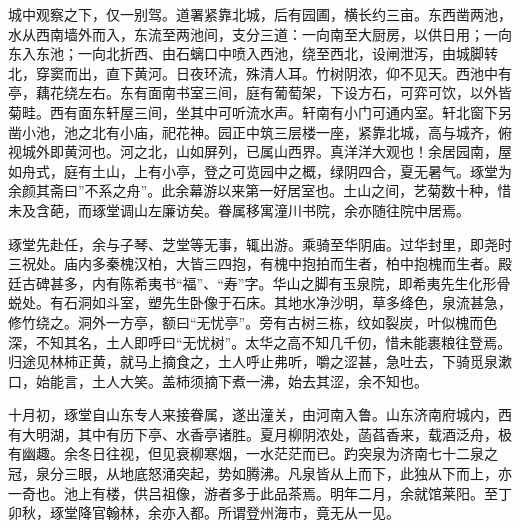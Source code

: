 \documentclass[]{article}
\begin{document}
城中观察之下，仅一别驾。道署紧靠北城，后有园圃，横长约三亩。东西凿两池，水从西南墙外而入，东流至两池间，支分三道：一向南至大厨房，以供日用；一向东入东池；一向北折西、由石螭口中喷入西池，绕至西北，设闸泄泻，由城脚转北，穿窦而出，直下黄河。日夜环流，殊清人耳。竹树阴浓，仰不见天。西池中有亭，藕花绕左右。东有面南书室三间，庭有葡萄架，下设方石，可弈可饮，以外皆菊畦。西有面东轩屋三间，坐其中可听流水声。轩南有小门可通内室。轩北窗下另凿小池，池之北有小庙，祀花神。园正中筑三层楼一座，紧靠北城，高与城齐，俯视城外即黄河也。河之北，山如屏列，已属山西界。真洋洋大观也！余居园南，屋如舟式，庭有土山，上有小亭，登之可览园中之概，绿阴四合，夏无暑气。琢堂为余颜其斋曰''不系之舟''。此余幕游以来第一好居室也。土山之间，艺菊数十种，惜未及含葩，而琢堂调山左廉访矣。眷属移寓潼川书院，余亦随往院中居焉。

琢堂先赴任，余与子琴、芝堂等无事，辄出游。乘骑至华阴庙。过华封里，即尧时三祝处。庙内多秦槐汉柏，大皆三四抱，有槐中抱拍而生者，柏中抱槐而生者。殿廷古碑甚多，内有陈希夷书``福''、``寿''字。华山之脚有玉泉院，即希夷先生化形骨蜕处。有石洞如斗室，塑先生卧像于石床。其地水净沙明，草多绛色，泉流甚急，修竹绕之。洞外一方亭，额曰``无忧亭''。旁有古树三栋，纹如裂炭，叶似槐而色深，不知其名，土人即呼曰``无忧树''。太华之高不知几千仞，惜未能裹粮往登焉。归途见林柿正黄，就马上摘食之，土人呼止弗听，嚼之涩甚，急吐去，下骑觅泉漱口，始能言，土人大笑。盖柿须摘下煮一沸，始去其涩，余不知也。

十月初，琢堂自山东专人来接眷属，遂出潼关，由河南入鲁。山东济南府城内，西有大明湖，其中有历下亭、水香亭诸胜。夏月柳阴浓处，菡萏香来，载酒泛舟，极有幽趣。余冬日往视，但见衰柳寒烟，一水茫茫而已。趵突泉为济南七十二泉之冠，泉分三眼，从地底怒涌突起，势如腾沸。凡泉皆从上而下，此独从下而上，亦一奇也。池上有楼，供吕祖像，游者多于此品茶焉。明年二月，余就馆莱阳。至丁卯秋，琢堂降官翰林，余亦入都。所谓登州海市，竟无从一见。
\end{document}
